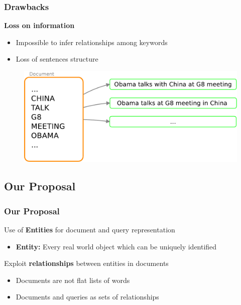 \documentclass{beamer}
\begin{document}
\begin{frame}
\frametitle{Drawbacks}
{\color{red}\bfseries{Loss on information}}\\
\smallskip
\begin{itemize}
\item Impossible to infer relationships among keywords
\item Loss of sentences structure
\end{itemize}
\bigskip
\begin{center}
\begin{figure}
\includegraphics[scale=0.45]{imgs/lossinfo}
\end{figure}
\end{center}
\end{frame}

\subsection{Our Proposal}

\begin{frame}
\frametitle{Our Proposal}
Use of {\bfseries Entities} for document and query representation\\
\smallskip
\begin{itemize}
\item{\bfseries Entity:} Every real world object which can be uniquely
  identified
\end{itemize}
\bigskip
Exploit {\bfseries relationships} between entities in documents\\
\smallskip
\begin{itemize}
\item Documents are not flat lists of words
\item Documents and queries as sets of relationships
\end{itemize}
\end{frame}
\end{document}
